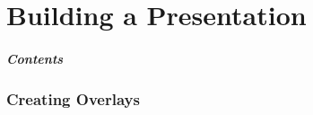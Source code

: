 \documentclass{beamer}
\begin{document}

\part{Building a Presentation}
\frame{\partpage}
\begin{frame}
  \frametitle{Contents}
\end{frame}
\section{Creating Overlays}
\end{document}
